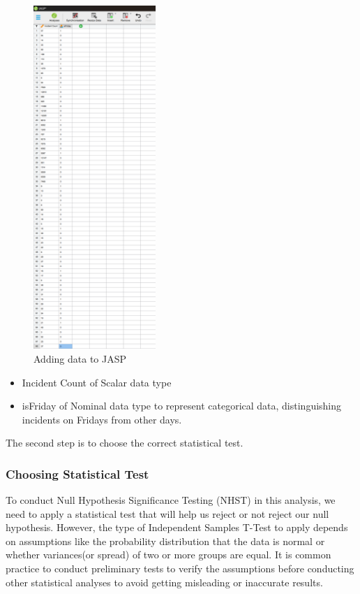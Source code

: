 \documentclass{article}
\begin{document}
\begin{figure}[H]
    \centering
    \includegraphics[width=0.5\linewidth, height=13cm]{resources/Screenshot 2024-09-25 011255.png}
    \caption{Adding data to JASP}
    \label{fig:enter-label}
\end{figure}

\begin{itemize}
    \item Incident Count of Scalar data type
    \item isFriday of Nominal data type to represent categorical data, distinguishing incidents on Fridays from other days.
\end{itemize}


The second step is to choose the correct statistical test.

\subsubsection{Choosing Statistical Test}
To conduct Null Hypothesis Significance Testing (NHST) in this analysis, we need to apply a statistical test that will help us reject or not reject our null hypothesis. However, the type of Independent Samples T-Test to apply depends on assumptions like the probability distribution that the data is normal or whether variances(or spread) of two or more groups are equal. It is common practice to conduct preliminary tests to verify the assumptions before conducting other statistical analyses to avoid getting misleading or inaccurate results.
\end{document}
